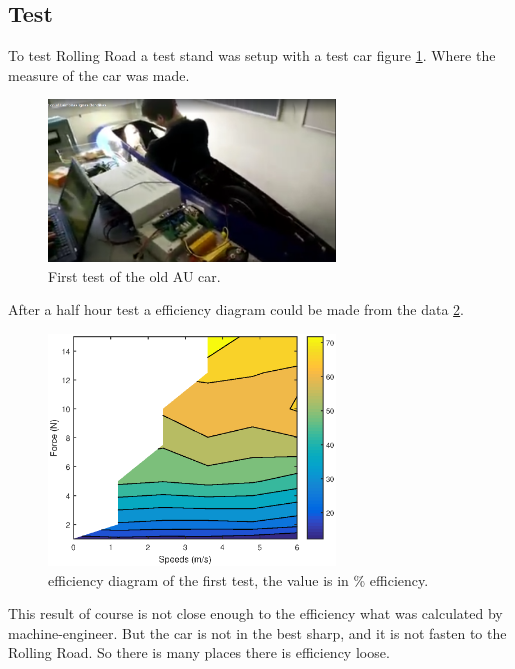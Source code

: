 \subsection{Test}
To test Rolling Road a test stand was setup with a test car figure \ref{fig:RR_first_test}. Where the measure of the car was made. 
\begin{figure}[H]
	\centering
	\includegraphics [width=3in]{SubPages/Images/jens_test.png}
	\caption{First test of the old AU car.}
	\label{fig:RR_first_test}
\end{figure}
After a half hour test a efficiency diagram could be made from the data \ref{fig:RR_first_test_result}.
\begin{figure}[H]
	\centering
	\includegraphics [width=3in]{SubPages/Images/RR_test_result.eps}
	\caption{efficiency diagram of the first test, the value is in \% efficiency.}
	\label{fig:RR_first_test_result}
\end{figure}
This result of course is not close enough to the efficiency what was calculated by machine-engineer. But the car is not in the best sharp, and it is not fasten to the Rolling Road. So there is many places there is efficiency loose.


